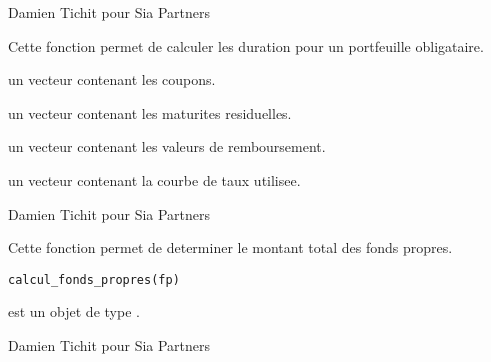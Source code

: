 \documentclass[a4paper]{book}
\begin{document}
%
\begin{Author}\relax
Damien Tichit pour Sia Partners
\end{Author}
%
\begin{Description}\relax
Cette fonction permet de calculer les duration pour un portfeuille obligataire.
\end{Description}
%
\begin{Arguments}
\begin{ldescription}
\item[\code{coupon}] un vecteur contenant  les coupons.

\item[\code{mat\_res}] un vecteur  contenant les maturites residuelles.

\item[\code{valeur\_remboursement}] un vecteur  contenant les valeurs de remboursement.

\item[\code{yield}] un vecteur contenant la courbe de taux utilisee.
\end{ldescription}
\end{Arguments}
%
\begin{Author}\relax
Damien Tichit pour Sia Partners
\end{Author}
%
\begin{Description}\relax
Cette fonction permet de determiner le montant total des fonds propres.
\end{Description}
%
\begin{Usage}
\begin{verbatim}
calcul_fonds_propres(fp)
\end{verbatim}
\end{Usage}
%
\begin{Arguments}
\begin{ldescription}
\item[\code{fp}] est un objet de type .
\end{ldescription}
\end{Arguments}
%
\begin{Author}\relax
Damien Tichit pour Sia Partners
\end{Author}
\end{document}
